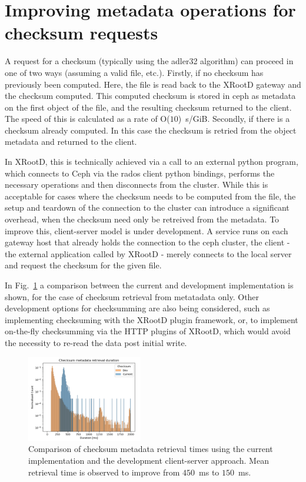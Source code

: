 \documentclass{webofc}
\begin{document}
\section{Improving metadata operations for checksum requests\label{sec:checksums}}
A request for a checksum (typically using the adler32 algorithm) can proceed in one of two ways (assuming a valid file, etc.). Firstly, if no checksum has previously been computed. Here, the file is read back to the XRootD gateway and the checksum computed. This computed checksum is stored in ceph as metadata on the first object of the file, and the resulting checksum returned to the client. The speed of this is calculated as a rate of O($10$)~s/GiB. Secondly, if there is a checksum already computed. In this case the checksum is retried from the object metadata and returned to the client. 

In XRootD, this is technically achieved via a call to an external python program, which connects to Ceph via the rados client python bindings, performs the necessary operations and then disconnects from the cluster. While this is acceptable for cases where the checksum needs to be computed from the file, the setup and teardown of the connection to the cluster can introduce a significant overhead, when the checksum need only be retreived from the metadata. 
To improve this, client-server model is under development. A service runs on each gateway host that already holds the connection to the ceph cluster, the client - the external application called by XRootD - merely connects to the local server and request the checksum for the given file. 

In Fig.~\ref{fig:checksumming} a comparison between the current and development implementation is shown, for the case of checksum retrieval from metatadata only. 
Other development options for checksumming are also being considered, such as implementing checksuming with the XRootD plugin framework, or, to implement on-the-fly checksumming via the HTTP plugins of XRootD, which would avoid the necessity to re-read the data post initial write. 
%
\begin{figure}[h]
     \centering
     \includegraphics[width=0.45\textwidth,clip]{figures/fig_checksum_meta.pdf}\hfil
     \caption{Comparison of checksum metadata retrieval times using the current implementation and the development client-server approach. Mean retrieval time is observed to improve from $450$~ms to $150$~ms.}
     \label{fig:checksumming}       %
\end{figure}
\end{document}
